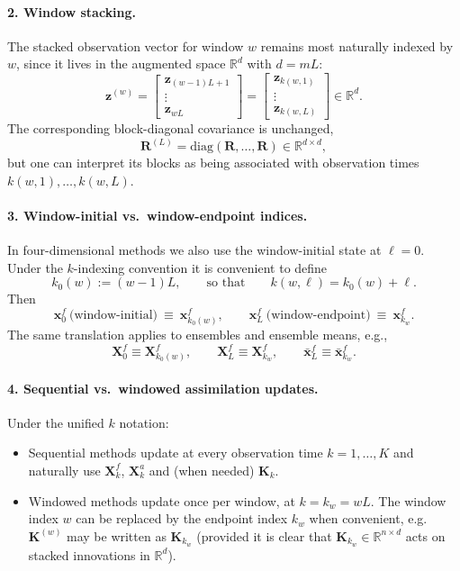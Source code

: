 \documentclass[11pt]{article}
\begin{document}
\paragraph{2. Window stacking.}
The stacked observation vector for window $w$ remains most naturally indexed by $w$, since it lives in the augmented space $\mathbb{R}^{d}$ with $d=mL$:
\begin{equation}
\mathbf{z}^{(w)}
=
\begin{bmatrix}
\mathbf{z}_{(w-1)L+1}\\
\vdots\\
\mathbf{z}_{wL}
\end{bmatrix}
=
\begin{bmatrix}
\mathbf{z}_{k(w,1)}\\
\vdots\\
\mathbf{z}_{k(w,L)}
\end{bmatrix}
\in\mathbb{R}^{d}.
\label{eq:stacked_z_k}
\end{equation}
The corresponding block-diagonal covariance is unchanged,
\[
\mathbf{R}^{(L)}=\mathrm{diag}(\mathbf{R},\ldots,\mathbf{R})\in\mathbb{R}^{d\times d},
\]
but one can interpret its blocks as being associated with observation times $k(w,1),\ldots,k(w,L)$.

\paragraph{3. Window-initial vs.\ window-endpoint indices.}
In four-dimensional methods we also use the window-initial state at $\ell=0$. Under the $k$-indexing convention it is convenient to define
\begin{equation}
k_0(w):=(w-1)L,
\qquad\text{so that}\qquad
k(w,\ell)=k_0(w)+\ell.
\label{eq:k0_def}
\end{equation}
Then
\[
\mathbf{x}^{f}_{0}\ \text{(window-initial)}\ \equiv\ \mathbf{x}^{f}_{k_0(w)},
\qquad
\mathbf{x}^{f}_{L}\ \text{(window-endpoint)}\ \equiv\ \mathbf{x}^{f}_{k_w}.
\]
The same translation applies to ensembles and ensemble means, e.g.,
\[
\mathbf{X}_0^{f}\equiv \mathbf{X}_{k_0(w)}^{f},
\qquad
\mathbf{X}_L^{f}\equiv \mathbf{X}_{k_w}^{f},
\qquad
\bar{\mathbf{x}}_L^{f}\equiv \bar{\mathbf{x}}_{k_w}^{f}.
\]

\paragraph{4. Sequential vs.\ windowed assimilation updates.}
Under the unified $k$ notation:
\begin{itemize}
\item Sequential methods update at every observation time $k=1,\ldots,K$ and naturally use $\mathbf{X}_k^{f}$, $\mathbf{X}_k^{a}$ and (when needed) $\mathbf{K}_k$.
\item Windowed methods update once per window, at $k=k_w=wL$. The window index $w$ can be replaced by the endpoint index $k_w$ when convenient, e.g.\ $\mathbf{K}^{(w)}$ may be written as $\mathbf{K}_{k_w}$ (provided it is clear that $\mathbf{K}_{k_w}\in\mathbb{R}^{n\times d}$ acts on stacked innovations in $\mathbb{R}^{d}$).
\end{itemize}
\end{document}
